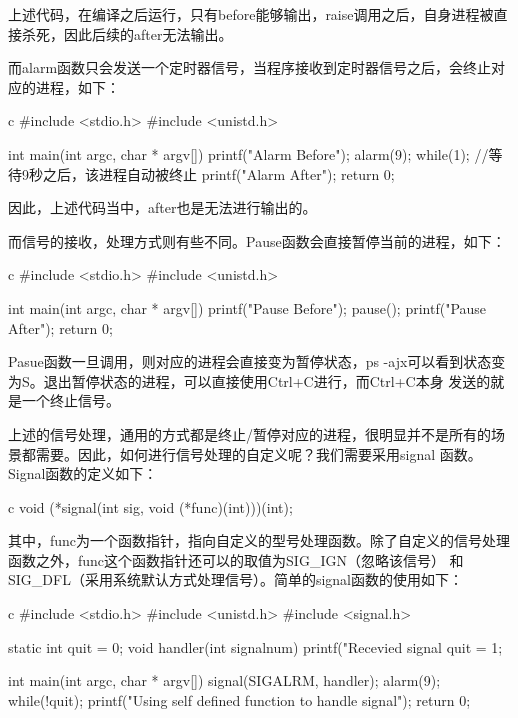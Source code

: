 上述代码，在编译之后运行，只有before能够输出，raise调用之后，自身进程被直接杀死，因此后续的after无法输出。

而alarm函数只会发送一个定时器信号，当程序接收到定时器信号之后，会终止对应的进程，如下：
\begin{code-block}{c}
#include <stdio.h>
#include <unistd.h>

int main(int argc, char * argv[])
{
        printf("Alarm Before\n");
        alarm(9);
        while(1); //等待9秒之后，该进程自动被终止
        printf("Alarm After\n");
        return 0;
}
\end{code-block}

因此，上述代码当中，after也是无法进行输出的。

而信号的接收，处理方式则有些不同。Pause函数会直接暂停当前的进程，如下：
\begin{code-block}{c}
#include <stdio.h>
#include <unistd.h>

int main(int argc, char * argv[])
{
        printf("Pause Before\n");
        pause();
        printf("Pause After\n");
        return 0;
}
\end{code-block}

Pasue函数一旦调用，则对应的进程会直接变为暂停状态，ps -ajx可以看到状态变为S。退出暂停状态的进程，可以直接使用Ctrl+C进行，而Ctrl+C本身
发送的就是一个终止信号。

上述的信号处理，通用的方式都是终止/暂停对应的进程，很明显并不是所有的场景都需要。因此，如何进行信号处理的自定义呢？我们需要采用signal
函数。Signal函数的定义如下：
\begin{code-block}{c}
void (*signal(int sig, void (*func)(int)))(int);
\end{code-block}

其中，func为一个函数指针，指向自定义的型号处理函数。除了自定义的信号处理函数之外，func这个函数指针还可以的取值为SIG\_IGN（忽略该信号）
和SIG\_DFL（采用系统默认方式处理信号）。简单的signal函数的使用如下：
\begin{code-block}{c}
#include <stdio.h>
#include <unistd.h>
#include <signal.h>

static int quit = 0;
void handler(int signalnum)
{
        printf("Recevied signal %
        quit = 1;
}

int main(int argc, char * argv[])
{
        signal(SIGALRM, handler);
        alarm(9);
        while(!quit);
        printf("Using self defined function to handle signal\n");
        return 0;
}
\end{code-block}

